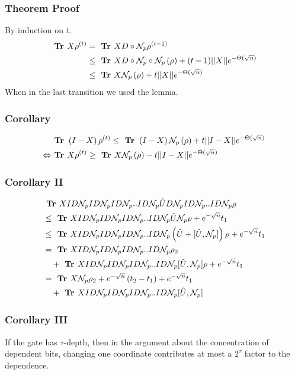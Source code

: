 \documentclass{beamer}
\begin{document}
\begin{frame}
  \frametitle{Theorem Proof}
  By induction on $t$.
  \begin{align*}
    \textbf{ Tr } X\rho^{(t)}  &=  \textbf{ Tr } X D \circ \mathcal{N}_{p} \rho^{(t-1)} \\
      & \le   \textbf{ Tr } X D \circ  \mathcal{N}_{p} \circ \mathcal{N}_{p} \left( \rho \right)  + (t-1)||X|| e^{- \Theta( \sqrt{n}) } \\
      & \le \textbf{ Tr } X  \mathcal{N}_{p} \left( \rho \right)  + t||X|| e^{- \Theta( \sqrt{n}) }
  \end{align*}
  When in the last transition we used the lemma. 
\end{frame}
\begin{frame}
  \frametitle{Corollary}

  \begin{align*}
    & \textbf{ Tr } \left( I - X \right) \rho^{(t)} \le \textbf{ Tr }  \left( I - X \right)  \mathcal{N}_{p} \left( \rho \right)  + t||I - X|| e^{- \Theta( \sqrt{n}) } \\ 
  \Leftrightarrow  & \textbf{ Tr } X\rho^{(t)} \ge \textbf{ Tr } X  \mathcal{N}_{p} \left( \rho \right)  - t||I - X|| e^{- \Theta( \sqrt{n}) }
  \end{align*}

\end{frame}

\begin{frame}
  \frametitle{Corollary II}

  \begin{align*}
    & \textbf{ Tr }  X I D \mathcal{N}_{p} I D \mathcal{N}_{p}I D \mathcal{N}_{p} .. I D \mathcal{N}_{p} \hat{U} D \mathcal{N}_{p} I D \mathcal{N}_{p} .. I D \mathcal{N}_{p}\rho  \\ 
    & \le \textbf{ Tr }  X I D \mathcal{N}_{p} I D \mathcal{N}_{p}I D \mathcal{N}_{p} .. I D \mathcal{N}_{p} \hat{U} \mathcal{N}_{p}\rho  + e^{-\sqrt{n}} t_{1}  \\
    & \le \textbf{ Tr }  X I D \mathcal{N}_{p} I D \mathcal{N}_{p}I D \mathcal{N}_{p} .. I D \mathcal{N}_{p} \left( \hat{U} + [\hat{U} ,\mathcal{N}_{p}] \right) \rho  + e^{-\sqrt{n}} t_{1}  \\ 
    & = \textbf{ Tr }  X I D \mathcal{N}_{p} I D \mathcal{N}_{p}I D \mathcal{N}_{p} .. I D \mathcal{N}_{p} \rho_{2} \\
    & \ \ \ +  \textbf{ Tr }  X I D \mathcal{N}_{p} I D \mathcal{N}_{p}I D \mathcal{N}_{p} .. I D \mathcal{N}_{p} [\hat{U} ,\mathcal{N}_{p}]  \rho+ e^{-\sqrt{n}} t_{1}  \\ 
    & = \textbf{ Tr }  X \mathcal{N}_{p} \rho_{2}  + e^{-\sqrt{n}} \left( t_{2} - t_{1} \right) + e^{-\sqrt{n}} t_{1}  \\ 
 & \ \ \ + \textbf{ Tr }  X I D \mathcal{N}_{p} I D \mathcal{N}_{p}I D \mathcal{N}_{p} .. I D \mathcal{N}_{p} [\hat{U} ,\mathcal{N}_{p}] \\
  \end{align*}

\end{frame}

\begin{frame}
  \frametitle{Corollary III}
If the gate has $\tau$-depth, then in the argument about the concentration of dependent bits, changing one coordinate contributes at most a $2^{\tau}$ factor to the dependence.
\end{frame}
\end{document}

